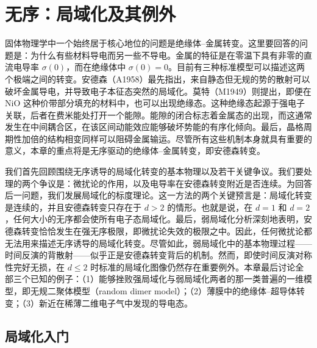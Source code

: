 \chapter{无序：局域化及其例外}

固体物理学中一个始终居于核心地位的问题是绝缘体--金属转变。这里要回答的问题是：为什么有些材料导电而另一些不导电。金属的特征是在零温下具有非零的直流电导率 $\sigma(0)$，而在绝缘体中 $\sigma(0)=0$。目前有三种标准模型可以描述这两个极端之间的转变。安德森（A1958）最先指出，来自静态但无规的势的散射可以破坏金属导电，并导致电子本征态突然的局域化。莫特（M1949）则提出，即便在 NiO 这种价带部分填充的材料中，也可以出现绝缘态。这种绝缘态起源于强电子关联，后者在费米能处打开一个能隙。能隙的闭合标志着金属态的出现，而这通常发生在中间耦合区，在该区间动能效应能够破坏势能的有序化倾向。最后，晶格周期性加倍的结构相变同样可以阻碍金属输运。尽管所有这些机制本身就具有重要的意义，本章的重点将是无序驱动的绝缘体--金属转变，即安德森转变。

我们首先回顾围绕无序诱导的局域化转变的基本物理以及若干关键争议。我们要处理的两个争议是：微扰论的作用，以及电导率在安德森转变附近是否连续。为回答后一问题，我们发展局域化的标度理论。这一方法的两个关键预言是：局域化转变是连续的，并且安德森转变只存在于 $d>2$ 的情形。也就是说，在 $d=1$ 和 $d=2$，任何大小的无序都会使所有电子态局域化。最后，弱局域化分析深刻地表明，安德森转变恰恰发生在强无序极限，即微扰论失效的极限之中。因此，任何微扰论都无法用来描述无序诱导的局域化转变。尽管如此，弱局域化中的基本物理过程——时间反演的背散射——似乎正是安德森转变背后的机制。然而，即使时间反演对称性完好无损，在 $d\leq 2$ 时标准的局域化图像仍然存在重要例外。本章最后讨论全部三个已知的例子：（1）能够挫败强局域化与弱局域化两者的那一类普遍的一维模型，即无规二聚体模型（random dimer model）；（2）薄膜中的绝缘体--超导体转变；（3）新近在稀薄二维电子气中发现的导电态。

\section{局域化入门}

